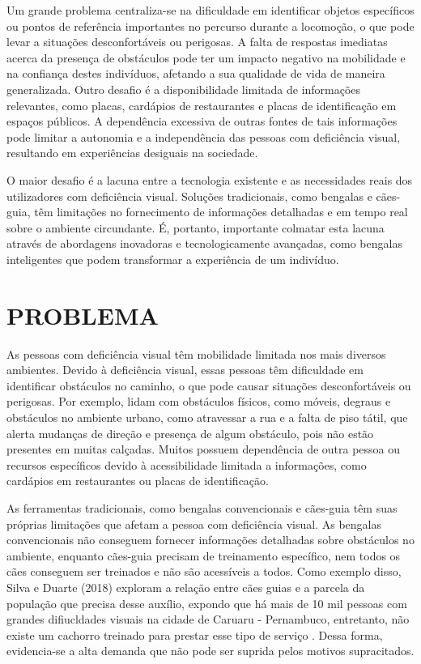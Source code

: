 Um grande problema centraliza-se na dificuldade em identificar objetos específicos ou pontos de referência importantes no percurso durante a locomoção, o que pode levar a situações desconfortáveis ou perigosas. A falta de  respostas imediatas acerca da presença de obstáculos pode ter um impacto negativo na mobilidade e na confiança destes indivíduos, afetando a sua qualidade de vida de maneira generalizada. Outro desafio é a disponibilidade limitada de informações relevantes, como placas, cardápios de restaurantes e placas de identificação em espaços públicos. A dependência excessiva de outras fontes de tais informações pode limitar a autonomia e a independência das pessoas com deficiência visual, resultando em experiências desiguais na sociedade.


O maior desafio é a lacuna entre a tecnologia existente e as necessidades reais dos utilizadores com deficiência visual. Soluções tradicionais, como bengalas e cães-guia, têm limitações no fornecimento de informações detalhadas e em tempo real sobre o ambiente circundante. É, portanto, importante colmatar esta lacuna através de abordagens inovadoras e tecnologicamente avançadas, como bengalas inteligentes que podem transformar a experiência de um indivíduo.


\section{PROBLEMA}
As pessoas com deficiência visual têm mobilidade limitada nos mais diversos ambientes. Devido à deficiência visual, essas pessoas têm dificuldade em identificar obstáculos no caminho, o que pode causar situações desconfortáveis ou perigosas. Por exemplo, lidam com obstáculos físicos, como móveis, degraus e obstáculos no ambiente urbano, como atravessar a rua e a falta de piso tátil, que alerta mudanças de direção e presença de algum obstáculo, pois não estão presentes em muitas calçadas. Muitos possuem dependência de outra pessoa ou recursos específicos devido à acessibilidade limitada a informações, como cardápios em restaurantes ou placas de identificação.

As ferramentas tradicionais, como bengalas convencionais e cães-guia têm suas próprias limitações que afetam a pessoa com deficiência visual. As bengalas convencionais não conseguem fornecer informações detalhadas sobre obstáculos no ambiente, enquanto cães-guia precisam de treinamento específico, nem todos os cães conseguem ser treinados e não são acessíveis a todos. Como exemplo disso, Silva e Duarte (2018) exploram a relação entre cães guias e a parcela da população que precisa desse auxílio, expondo que há mais de 10 mil pessoas com grandes difiucldades visuais na cidade de Caruaru - Pernambuco, entretanto, não existe um cachorro treinado para prestar esse tipo de serviço \cite{cao-guia-ta}. Dessa forma, evidencia-se a alta demanda que não pode ser suprida pelos motivos supracitados.

